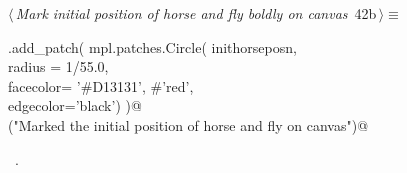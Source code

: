 \documentclass[11.5pt]{report}
\begin{document}
\begin{flushleft}
\begin{list}{}{\setlength{\itemsep}{-\parsep}\setlength{\itemindent}{-\leftmargin}}
\item{}
\end{list}
\vspace{4ex}
\end{flushleft}

\vspace{-0.8cm}\newchunk 

\begin{flushleft} \small\label{scrap54}\raggedright\small
{} $\langle\,${\itshape Mark initial position of horse and fly boldly on canvas}\nobreak\ {\footnotesize {42b}}$\,\rangle\equiv$
\vspace{-1ex}
\begin{list}{}{} \item
\mbox{}\verb@ax.add_patch( mpl.patches.Circle( inithorseposn, \@\\
\mbox{}\verb@                                  radius = 1/55.0,\@\\
\mbox{}\verb@                                  facecolor= '#D13131', #'red',\@\\
\mbox{}\verb@                                  edgecolor='black')  )@\\
\mbox{}\verb@debug("Marked the initial position of horse and fly on canvas")@\\
\mbox{}\verb@@{\NWsep}
\end{list}
\vspace{-1.5ex}
\footnotesize
\begin{list}{}{\setlength{\itemsep}{-\parsep}\setlength{\itemindent}{-\leftmargin}}
\item \NWtxtMacroRefIn\ .

\item{}
\end{list}
\vspace{4ex}
\end{flushleft}
\end{document}
